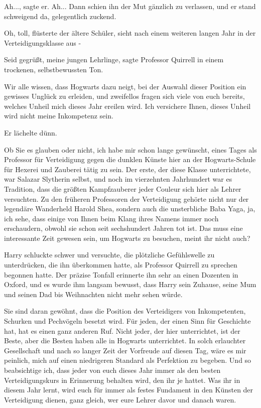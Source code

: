\glqq Ah...\grqq{}, sagte er. \glqq Ah...\grqq{} Dann schien ihn der Mut
gänzlich zu verlassen, und er stand schweigend da, gelegentlich zuckend.

\glqq Oh, toll\grqq{}, flüsterte der ältere Schüler, \glqq sieht nach einem
weiteren langen Jahr in der Verteidigungsklasse aus -\grqq{}

\glqq Seid gegrüßt, meine jungen Lehrlinge\grqq{}, sagte Professor Quirrell in
einem trockenen, selbstbewussten Ton.

\glqq Wir alle wissen, dass Hogwarts dazu neigt, bei der Auswahl dieser Position
ein gewisses Unglück zu erleiden, und zweifellos fragen sich viele von euch
bereits, welches Unheil mich dieses Jahr ereilen wird. Ich versichere Ihnen,
dieses Unheil wird nicht meine Inkompetenz sein.\grqq{}

Er lächelte dünn.

\glqq Ob Sie es glauben oder nicht, ich habe mir schon lange gewünscht, eines
Tages als Professor für Verteidigung gegen die dunklen Künste hier an der
Hogwarts-Schule für Hexerei und Zauberei tätig zu sein. Der erste, der diese
Klasse unterrichtete, war Salazar Slytherin selbst, und noch im vierzehnten
Jahrhundert war es Tradition, dass die größten Kampfzauberer jeder Couleur sich
hier als Lehrer versuchten. Zu den früheren Professoren der Verteidigung gehörte
nicht nur der legendäre Wanderheld Harold Shea, sondern auch die unsterbliche
Baba Yaga, ja, ich sehe, dass einige von Ihnen beim Klang ihres Namens immer
noch erschaudern, obwohl sie schon seit sechshundert Jahren tot ist. Das muss
eine interessante Zeit gewesen sein, um Hogwarts zu besuchen, meint ihr nicht
auch?\grqq{}

Harry schluckte schwer und versuchte, die plötzliche Gefühlswelle zu
unterdrücken, die ihn überkommen hatte, als Professor Quirrell zu sprechen
begonnen hatte. Der präzise Tonfall erinnerte ihn sehr an einen Dozenten in
Oxford, und es wurde ihm langsam bewusst, dass Harry sein Zuhause, seine Mum und
seinen Dad bis Weihnachten nicht mehr sehen würde.

\glqq Sie sind daran gewöhnt, dass die Position des Verteidigers von
Inkompetenten, Schurken und Pechvögeln besetzt wird. Für jeden, der einen Sinn
für Geschichte hat, hat es einen ganz anderen Ruf. Nicht jeder, der hier
unterrichtet, ist der Beste, aber die Besten haben alle in Hogwarts
unterrichtet. In solch erlauchter Gesellschaft und nach so langer Zeit der
Vorfreude auf diesen Tag, wäre es mir peinlich, mich auf einen niedrigeren
Standard als Perfektion zu begeben. Und so beabsichtige ich, dass jeder von euch
dieses Jahr immer als den besten Verteidigungskurs in Erinnerung behalten wird,
den ihr je hattet. Was ihr in diesem Jahr lernt, wird euch für immer als festes
Fundament in den Künsten der Verteidigung dienen, ganz gleich, wer eure Lehrer
davor und danach waren.\grqq{}


